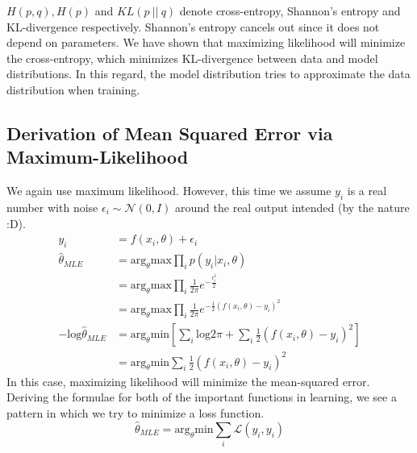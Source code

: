 \documentclass{article}
\numberwithin{equation}{subsection}
\begin{document}
$H(p,q), H(p)$ and $KL(p\ ||\ q)$ denote cross-entropy, Shannon's entropy and KL-divergence respectively. Shannon's entropy cancels out since it does not depend on parameters. We have shown that maximizing likelihood will minimize the cross-entropy, which minimizes KL-divergence between data and model distributions. In this regard, the model distribution tries to approximate the data distribution when training. 
\subsection{Derivation of Mean Squared Error via Maximum-Likelihood}
We again use maximum likelihood. However, this time we assume $y_i$ is a real number with noise $\epsilon_i \sim \mathcal{N}(0, I)$ around the real output intended (by the nature :D).
\begin{align}
    y_i &= f(x_i,\theta)+\epsilon_i\\
    \hat{\theta}_{MLE} &= \text{arg}_\theta \text{max} \prod_i p(y_i|x_i,\theta)\\
    &= \text{arg}_\theta \text{max} \prod_i \frac{1}{2\pi}e^{-\frac{\epsilon_i^2}{2}}\\
    &= \text{arg}_\theta \text{max} \prod_i \frac{1}{2\pi}e^{-\frac{1}{2}(f(x_i,\theta)-y_i)^2}\\
    -\text{log}\hat{\theta}_{MLE} &= \text{arg}_\theta \text{min} [\sum_i \text{log}2\pi + \sum_i \frac{1}{2}(f(x_i,\theta)-y_i)^2]\\
    &= \text{arg}_\theta \text{min} \sum_i \frac{1}{2}(f(x_i,\theta)-y_i)^2
\end{align}
In this case, maximizing likelihood will minimize the mean-squared error. Deriving the formulae for both of the important functions in learning, we see a pattern in which we try to minimize a loss function. 
\begin{equation}
    \hat{\theta}_{MLE} = \text{arg}_\theta \text{min} \sum_i \mathcal{L}(\hat{y_i},y_i)
\end{equation}
\end{document}
